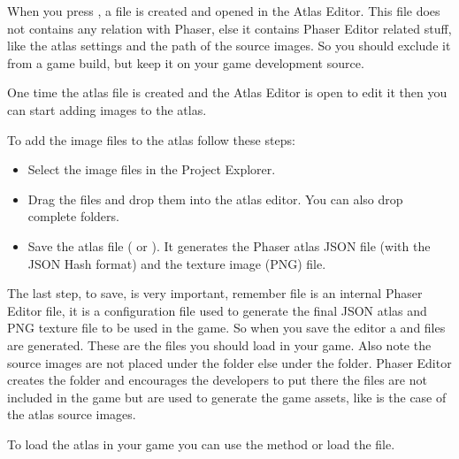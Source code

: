\documentclass[letterpaper,10pt,english]{sphinxmanual}
\begin{document}
\noindent{}

When you press , a file  is created and opened in the Atlas Editor. This file does not contains any relation with Phaser, else it contains Phaser Editor related stuff, like the atlas settings and the path of the source images. So you should exclude it from a game build,  but keep it on your game development source.

One time the atlas file is created and the Atlas Editor is open to edit it then you can start adding images to the atlas.

To add the image files to the atlas follow these steps:
\begin{itemize}
\item {} 
Select the image files in the Project Explorer.

\item {} 
Drag the files and drop them into the atlas editor. You can also drop complete folders.

\item {} 
Save the atlas file ( or ). It generates the Phaser atlas JSON file (with the JSON Hash format) and the texture image (PNG) file.

\end{itemize}

\noindent{}

The last step, to save, is very important, remember  file is an internal Phaser Editor file, it is a configuration file used to generate the final JSON atlas and PNG texture file to be used in the game. So when you save the editor a  and  files are generated. These are the files you should load in your game. Also note the source images are not placed under the  folder else under the  folder. Phaser Editor creates the  folder and encourages the developers to put there the files are not included in the game but are used to generate the game assets, like is the case of the atlas source images.

To load the atlas in your game you can use the  method or load the  file.

\noindent{}
\end{document}
